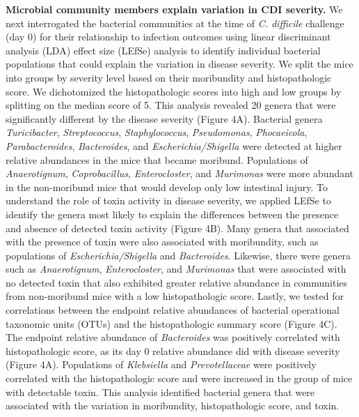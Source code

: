 \documentclass[
  12pt,
]{article}
\begin{document}
\textbf{Microbial community members explain variation in CDI severity.}
We next interrogated the bacterial communities at the time of \emph{C.
difficile} challenge (day 0) for their relationship to infection
outcomes using linear discriminant analysis (LDA) effect size (LEfSe)
analysis to identify individual bacterial populations that could explain
the variation in disease severity. We split the mice into groups by
severity level based on their moribundity and histopathologic score. We
dichotomized the histopathologic scores into high and low groups by
splitting on the median score of 5. This analysis revealed 20 genera
that were significantly different by the disease severity (Figure 4A).
Bacterial genera \emph{Turicibacter}, \emph{Streptococcus},
\emph{Staphylococcus}, \emph{Pseudomonas}, \emph{Phocaeicola},
\emph{Parabacteroides}, \emph{Bacteroides}, and
\emph{Escherichia/Shigella} were detected at higher relative abundances
in the mice that became moribund. Populations of \emph{Anaerotignum},
\emph{Coprobacillus}, \emph{Enterocloster}, and \emph{Murimonas} were
more abundant in the non-moribund mice that would develop only low
intestinal injury. To understand the role of toxin activity in disease
severity, we applied LEfSe to identify the genera most likely to explain
the differences between the presence and absence of detected toxin
activity (Figure 4B). Many genera that associated with the presence of
toxin were also associated with moribundity, such as populations of
\emph{Escherichia/Shigella} and \emph{Bacteroides}. Likewise, there were
genera such as \emph{Anaerotignum}, \emph{Enterocloster}, and
\emph{Murimonas} that were associated with no detected toxin that also
exhibited greater relative abundance in communities from non-moribund
mice with a low histopathologic score. Lastly, we tested for
correlations between the endpoint relative abundances of bacterial
operational taxonomic units (OTUs) and the histopathologic summary score
(Figure 4C). The endpoint relative abundance of \emph{Bacteroides} was
positively correlated with histopathologic score, as its day 0 relative
abundance did with disease severity (Figure 4A). Populations of
\emph{Klebsiella} and \emph{Prevotellaceae} were positively correlated
with the histopathologic score and were increased in the group of mice
with detectable toxin. This analysis identified bacterial genera that
were associated with the variation in moribundity, histopathologic
score, and toxin.
\end{document}
